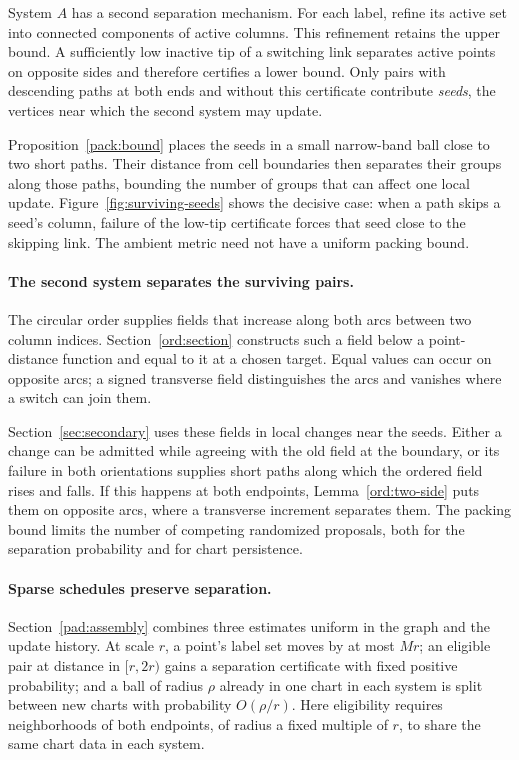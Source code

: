 System $A$ has a second separation mechanism. For each label, refine
its active set into connected components of active columns. This
refinement retains the upper bound. A sufficiently low inactive tip
of a switching link separates active points on opposite sides and
therefore certifies a lower bound. Only pairs with descending paths
at both ends and without this certificate contribute \emph{seeds},
the vertices near which the second system may update.

Proposition~\ref{pack:bound} places the seeds in a small narrow-band
ball close to two short paths. Their distance from cell boundaries
then separates their groups along those paths, bounding the number
of groups that can affect one local update.
Figure~\ref{fig:surviving-seeds} shows the decisive case: when a path
skips a seed's column, failure of the low-tip certificate forces that
seed close to the skipping link. The ambient metric need not have
a uniform packing bound.

\paragraph{The second system separates the surviving pairs.}
The circular order supplies fields that increase along both arcs
between two column indices. Section~\ref{ord:section} constructs
such a field below a point-distance function and equal to it at a
chosen target. Equal values
can occur on opposite arcs; a signed transverse field distinguishes
the arcs and vanishes where a switch can join them.

Section~\ref{sec:secondary} uses these fields in local changes near
the seeds. Either a change can be admitted while agreeing with the
old field at the boundary, or its failure in both orientations
supplies short paths along which the ordered field rises and falls.
If this happens at both endpoints, Lemma~\ref{ord:two-side} puts them on opposite
arcs, where a transverse increment separates them. The packing
bound limits the number of competing randomized proposals, both
for the separation probability and for chart persistence.

\paragraph{Sparse schedules preserve separation.}
Section~\ref{pad:assembly} combines three estimates uniform in the
graph and the update history. At scale $r$, a point's label set moves
by at most $Mr$; an eligible pair at distance in $[r,2r)$ gains a
separation certificate with fixed positive probability; and a ball of
radius $\rho$ already in one chart in
each system is split between new charts with probability
$O(\rho/r)$. Here eligibility requires neighborhoods of both
endpoints, of radius a fixed multiple of $r$, to share the same
chart data in each system.

